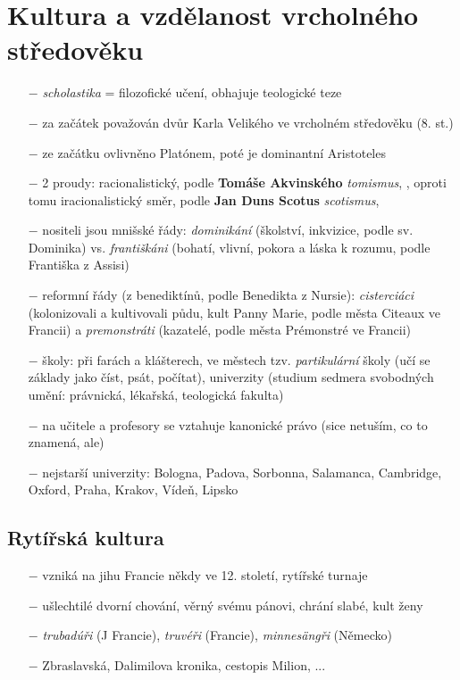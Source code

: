 \documentclass{article}
\begin{document}
\section*{Kultura a vzdělanost vrcholného středověku}
\begin{itemize}
    \vspace{-0.5em}
    \setlength\itemsep{0.15em}
    \item[$-$] \textit{scholastika} = filozofické učení, obhajuje teologické teze
    \item[$-$] za začátek považován dvůr Karla Velikého ve vrcholném středověku (8. st.)
    \item[$-$] ze začátku ovlivněno Platónem, poté je dominantní Aristoteles
    \item[$-$] 2 proudy: racionalistický, podle \textbf{Tomáše Akvinského} \textit{tomismus}, , oproti tomu iracionalistický směr, podle \textbf{Jan Duns Scotus} \textit{scotismus}, 
    \item[$-$] nositeli jsou mnišské řády: \textit{dominikání} (školství, inkvizice, podle sv. Dominika) vs. \textit{františkáni} (bohatí, vlivní, pokora a láska k rozumu, podle Františka z Assisi)
    \item[$-$] reformní řády (z benediktínů, podle Benedikta z Nursie): \textit{cisterciáci} (kolonizovali a kultivovali půdu, kult Panny Marie, podle města Citeaux ve Francii) a \textit{premonstráti} (kazatelé, podle města Prémonstré ve Francii)
    \item[$-$] školy: při farách a klášterech, ve městech tzv. \textit{partikulární} školy (učí se základy jako číst, psát, počítat), univerzity (studium sedmera svobodných umění: právnická, lékařská, teologická fakulta)
    \item[$-$] na učitele a profesory se vztahuje kanonické právo (sice netuším, co to znamená, ale)
    \item[$-$] nejstarší univerzity: Bologna, Padova, Sorbonna, Salamanca, Cambridge, Oxford, Praha, Krakov, Vídeň, Lipsko
\end{itemize}

\subsection*{Rytířská kultura}
\begin{itemize}
    \vspace{-0.5em}
    \setlength\itemsep{0.15em}
    \item[$-$] vzniká na jihu Francie někdy ve 12. století, rytířské turnaje
    \item[$-$] ušlechtilé dvorní chování, věrný svému pánovi, chrání slabé, kult ženy
    \item[$-$] \textit{trubadúři} (J Francie), \textit{truvéři} (Francie), \textit{minnesängři} (Německo)
    \item[$-$] Zbraslavská, Dalimilova kronika, cestopis Milion, ...
\end{itemize}
\end{document}

